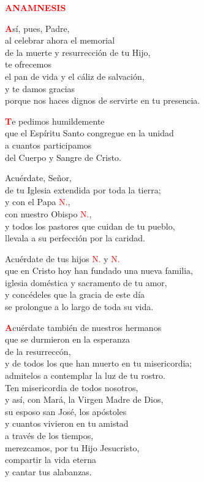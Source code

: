 \documentclass[12pt, letterpaper, spanish]{report}
\begin{document}
\Large {\bfseries \textcolor{red}{ANAMNESIS}} \newline

\Large \lettrine{\bfseries \textcolor{red}{A}}{}s\'i, pues, Padre,\\
al celebrar ahora el memorial\\
de la muerte y resurrecci\'on de tu Hijo,\\
te ofrecemos\\
el pan de vida y el c\'aliz de salvaci\'on,\\
y te damos gracias\\
porque nos haces dignos de servirte en tu presencia.\newline

\lettrine{\bfseries \textcolor{red}{T}}{}e pedimos humildemente\\
que el Esp\'iritu Santo congregue en la unidad\\
a cuantos participamos\\
del Cuerpo y Sangre de Cristo.\newline

Acu\'erdate, Se\~nor,\\
de tu Iglesia extendida por toda la tierra; \\
y con el Papa \textcolor{red}{N.},\\
con nuestro Obispo \textcolor{red}{N.},\\
y todos los pastores que cuidan de tu pueblo,\\
llevala a su perfecci\'on por la caridad.\newline

Acu\'erdate de tus hijos \textcolor{red}{N.} y \textcolor{red}{N.} \\
que en Cristo hoy han fundado una nueva familia, \\
iglesia dom\'estica y sacramento de tu amor, \\
y conc\'edeles que la gracia de este d\'ia \\
se prolongue a lo largo de toda su vida.\newline

\lettrine{\bfseries \textcolor{red}{A}}{}cu\'erdate tambi\'en de nuestros hermanos\\
que se durmieron en la esperanza\\
de la resurrecc\'on,\\
y de todos los que han muerto en tu misericordia;\\
admitelos a contemplar la luz de tu rostro.\\
Ten misericordia de todos nosotros,\\
y as\'i, con Mar\'a, la Virgen Madre de Dios,\\
su esposo san Jos\'e, los ap\'ostoles\\
y cuantos vivieron en tu amistad\\
a trav\'es de los tiempos,\\
merezcamos, por tu Hijo Jesucristo,\\
compartir la vida eterna\\
y cantar tus alabanzas.\newline
\end{document}
